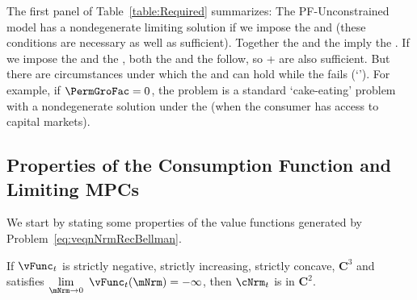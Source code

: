 \documentclass[\econtexRoot/BufferStockTheory]{subfiles}
\begin{document}
The first panel of Table~\ref{table:Required} summarizes: The PF-Unconstrained model has a nondegenerate limiting solution if we impose the {\RIC} and {\FHWC} (these conditions are necessary as well as sufficient).
Together the {\PFFVAC} and the {\FHWC} imply the {\RIC}.
If we impose the {\GICRaw} and the {\FHWC}, both the {\PFFVAC} and the {\RIC} follow, so {\GICRaw}+{\FHWC} are also sufficient.
But there are circumstances under which the {\RIC} and {\FHWC} can hold while the {\PFFVAC} fails (`\cncl{\PFFVAC}').
For example, if $\PermGroFac=0$, the problem is a standard `cake-eating' problem with a nondegenerate solution under the {\RIC} (when the consumer has access to capital markets).%



\subsection{Properties of the Consumption Function and Limiting MPCs}\label{sec:MPCiterproofs}


We start by stating some properties of the value functions generated by Problem~\eqref{eq:veqnNrmRecBellman}.



\begin{lemma}
If $\vFunc_{t}$ is strictly negative, strictly increasing, strictly concave, $\mathbf{C}^{3}$ and satisfies $\lim\limits_{\mNrm\rightarrow 0}~\vFunc_{t}(\mNrm) =-\infty $, then $\cNrm_{t}$ is in $\mathbf{C}^{2}$.

\end{lemma}
\end{document}
